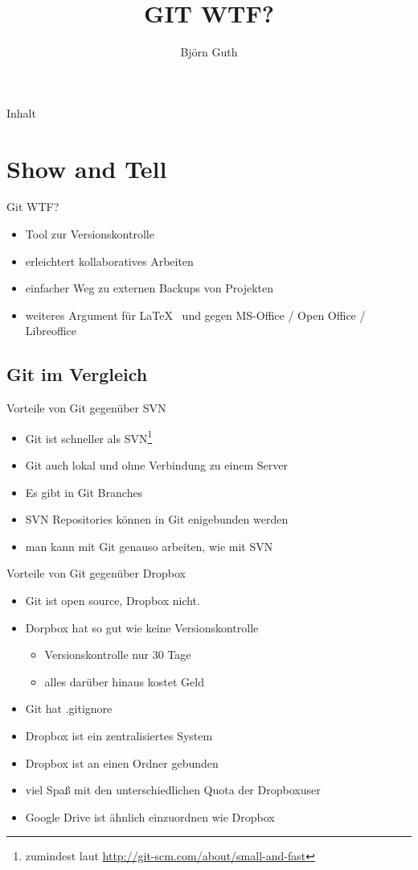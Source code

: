 \documentclass{beamer}
\title{GIT WTF?}
\author{Björn Guth}
\institute[Fachschaft I/1]{Fachschaft Mathematik/Physik/Informatik der RWTH Aachen}
\begin{document}
\frame[plain]{\titlepage}

\begin{frame}{Inhalt}
	\tableofcontents
\end{frame}

\section{Show and Tell}
\begin{frame}{Git WTF?}
	\begin{itemize}
		\item Tool zur Versionskontrolle
		\item erleichtert kollaboratives Arbeiten
		\item einfacher Weg zu externen Backups von Projekten
		\item weiteres Argument für \LaTeX~ und gegen MS-Office / Open Office / Libreoffice
	\end{itemize}
\end{frame}

\subsection{Git im Vergleich}
\begin{frame}{Vorteile von Git gegenüber SVN}
	\begin{itemize}
		\item Git ist schneller als SVN\footnote{zumindest laut \url{http://git-scm.com/about/small-and-fast}}
		\item Git auch lokal und ohne Verbindung zu einem Server
		\item Es gibt in Git Branches
		\item SVN Repositories können in Git enigebunden werden
		\item man kann mit Git genauso arbeiten, wie mit SVN
	\end{itemize}
\end{frame}

\begin{frame}{Vorteile von Git gegenüber Dropbox}
	\begin{itemize}
		\item Git ist open source, Dropbox nicht.
		\item Dorpbox hat so gut wie keine Versionskontrolle
			\begin{itemize}
				\item Versionskontrolle nur 30 Tage
				\item alles darüber hinaus kostet Geld
			\end{itemize}
		\item Git hat .gitignore
		\item Dropbox ist ein zentralisiertes System
		\item Dropbox ist an einen Ordner gebunden
		\item viel Spaß mit den unterschiedlichen Quota der Dropboxuser
		\item Google Drive ist ähnlich einzuordnen wie Dropbox
	\end{itemize}
\end{frame}
\end{document}

